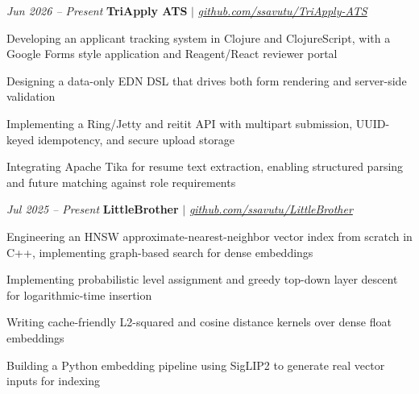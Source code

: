 \begin{twocolentry}{
        \textit{Jun 2026 – Present}}
    \textbf{TriApply ATS} \textnormal{$|$} \textit{\href{https://github.com/ssavutu/TriApply-ATS}{github.com/ssavutu/TriApply-ATS}}
\end{twocolentry}

\vspace{0.09 cm}
\begin{onecolentry}
    \begin{highlights}
        \item Developing an applicant tracking system in Clojure and ClojureScript, with a Google Forms style application and Reagent/React reviewer portal
        \item Designing a data-only EDN DSL that drives both form rendering and server-side validation
        \item Implementing a Ring/Jetty and reitit API with multipart submission, UUID-keyed idempotency, and secure upload storage
        \item Integrating Apache Tika for resume text extraction, enabling structured parsing and future matching against role requirements
    \end{highlights}
\end{onecolentry}

\vspace{0.11 cm}
\begin{twocolentry}{
        \textit{Jul 2025 – Present}}
    \textbf{LittleBrother} \textnormal{$|$} \textit{\href{https://github.com/ssavutu/LittleBrother}{github.com/ssavutu/LittleBrother}}
\end{twocolentry}

\vspace{0.09 cm}
\begin{onecolentry}
    \begin{highlights}
        \item Engineering an HNSW approximate-nearest-neighbor vector index from scratch in C++, implementing graph-based search for dense embeddings
        \item Implementing probabilistic level assignment and greedy top-down layer descent for logarithmic-time insertion
        \item Writing cache-friendly L2-squared and cosine distance kernels over dense float embeddings
        \item Building a Python embedding pipeline using SigLIP2 to generate real vector inputs for indexing
    \end{highlights}
\end{onecolentry}

